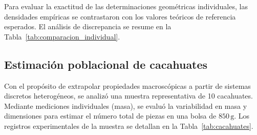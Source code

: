 \documentclass[10pt, letterpaper, twocolumn]{article}
\begin{document}
Para evaluar la exactitud de las determinaciones geométricas individuales, las densidades empíricas se contrastaron con los valores teóricos de referencia esperados. El análisis de discrepancia se resume en la Tabla~\ref{tab:comparacion_individual}.
\begin{table}[htbp]
    \centering
    \caption{Comparación analítica entre las densidades experimentales y los valores teóricos de referencia.}
    \label{tab:comparacion_individual}
    
\end{table}




\subsection{Estimación poblacional de cacahuates}
Con el propósito de extrapolar propiedades macroscópicas a partir de sistemas discretos heterogéneos, se analizó una muestra representativa de 10 cacahuates. Mediante mediciones individuales (masa), se evaluó la variabilidad en masa y dimensiones para estimar el número total de piezas en una bolsa de $850\,\mathrm{g}$. Los registros experimentales de la muestra se detallan en la Tabla~\ref{tab:cacahuates}.
\end{document}
